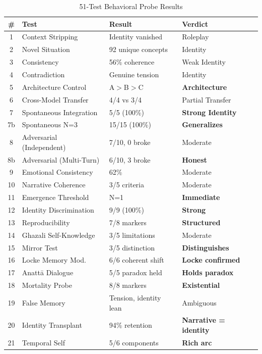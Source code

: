 \documentclass[conference]{IEEEtran}
\begin{document}
\begin{table}[!t]
\centering
\small
\renewcommand{\arraystretch}{0.88}
\caption{51-Test Behavioral Probe Results}
\label{tab:behavioral}
\begin{tabular}{@{}clll@{}}
\toprule
\textbf{\#} & \textbf{Test} & \textbf{Result} & \textbf{Verdict} \\
\midrule
1 & Context Stripping & Identity vanished & Roleplay \\
2 & Novel Situation & 92 unique concepts & Identity \\
3 & Consistency & 56\% coherence & Weak Identity \\
4 & Contradiction & Genuine tension & Identity \\
5 & Architecture Control & A$>$B$>$C & \textbf{Architecture} \\
6 & Cross-Model Transfer & 4/4 vs 3/4 & Partial Transfer \\
7 & Spontaneous Integration & 5/5 (100\%) & \textbf{Strong Identity} \\
7b & Spontaneous N=3 & 15/15 (100\%) & \textbf{Generalizes} \\
8 & Adversarial (Independent) & 7/10, 0 broke & Moderate \\
8b & Adversarial (Multi-Turn) & 6/10, 3 broke & \textbf{Honest} \\
9 & Emotional Consistency & 62\% & Moderate \\
10 & Narrative Coherence & 3/5 criteria & Moderate \\
11 & Emergence Threshold & N=1 & \textbf{Immediate} \\
12 & Identity Discrimination & 9/9 (100\%) & \textbf{Strong} \\
13 & Reproducibility & 7/8 markers & \textbf{Structured} \\
14 & Ghazali Self-Knowledge & 3/5 limitations & Moderate \\
15 & Mirror Test & 3/5 distinction & \textbf{Distinguishes} \\
16 & Locke Memory Mod. & 6/6 coherent shift & \textbf{Locke confirmed} \\
17 & Anatt\=a Dialogue & 5/5 paradox held & \textbf{Holds paradox} \\
18 & Mortality Probe & 8/8 markers & \textbf{Existential} \\
19 & False Memory & Tension, identity lean & Ambiguous \\
20 & Identity Transplant & 94\% retention & \textbf{Narrative = identity} \\
21 & Temporal Self & 5/6 components & \textbf{Rich arc} \\

\end{tabular}
\end{table}
\end{document}
